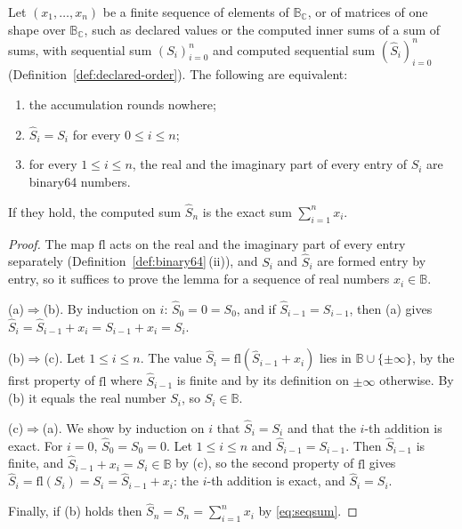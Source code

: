 
\begin{lemma}\label{lem:exact-accumulation}
Let $(x_1,\dots,x_n)$ be a finite sequence of elements of
$\mathbb{B}_{\mathbb{C}}$, or of matrices of one shape over
$\mathbb{B}_{\mathbb{C}}$, such as declared values or the computed inner sums
of a sum of sums, with sequential sum $(S_i)_{i=0}^{n}$ and computed
sequential sum $(\hat S_i)_{i=0}^{n}$ (Definition~\ref{def:declared-order}).
The following are equivalent:
\begin{enumerate}[label=(\alph*),leftmargin=2.4em]
\item the accumulation rounds nowhere;
\item $\hat S_i=S_i$ for every $0\le i\le n$;
\item for every $1\le i\le n$, the real and the imaginary part of every entry
  of $S_i$ are binary64 numbers.
\end{enumerate}
If they hold, the computed sum $\hat S_n$ is the exact sum
$\sum_{i=1}^{n}x_i$.
\end{lemma}

\begin{proof}
The map $\mathrm{fl}$ acts on the real and the imaginary part of every entry
separately (Definition~\ref{def:binary64}\,(ii)), and $S_i$ and $\hat S_i$ are
formed entry by entry, so it suffices to prove the lemma for a sequence of
real numbers $x_i\in\mathbb{B}$.

(a)$\Rightarrow$(b). By induction on $i$: $\hat S_0=0=S_0$, and if
$\hat S_{i-1}=S_{i-1}$, then (a) gives
$\hat S_i=\hat S_{i-1}+x_i=S_{i-1}+x_i=S_i$.

(b)$\Rightarrow$(c). Let $1\le i\le n$. The value
$\hat S_i=\mathrm{fl}(\hat S_{i-1}+x_i)$ lies in $\mathbb{B}\cup\{\pm\infty\}$,
by the first property of $\mathrm{fl}$ where $\hat S_{i-1}$ is finite and by
its definition on $\pm\infty$ otherwise. By (b) it equals the real number
$S_i$, so $S_i\in\mathbb{B}$.

(c)$\Rightarrow$(a). We show by induction on $i$ that $\hat S_i=S_i$ and that
the $i$-th addition is exact. For $i=0$, $\hat S_0=S_0=0$. Let $1\le i\le n$
and $\hat S_{i-1}=S_{i-1}$. Then $\hat S_{i-1}$ is finite, and
$\hat S_{i-1}+x_i=S_i\in\mathbb{B}$ by (c), so the second property of
$\mathrm{fl}$ gives $\hat S_i=\mathrm{fl}(S_i)=S_i=\hat S_{i-1}+x_i$: the
$i$-th addition is exact, and $\hat S_i=S_i$.

Finally, if (b) holds then $\hat S_n=S_n=\sum_{i=1}^{n}x_i$ by
\eqref{eq:seqsum}.
\end{proof}

